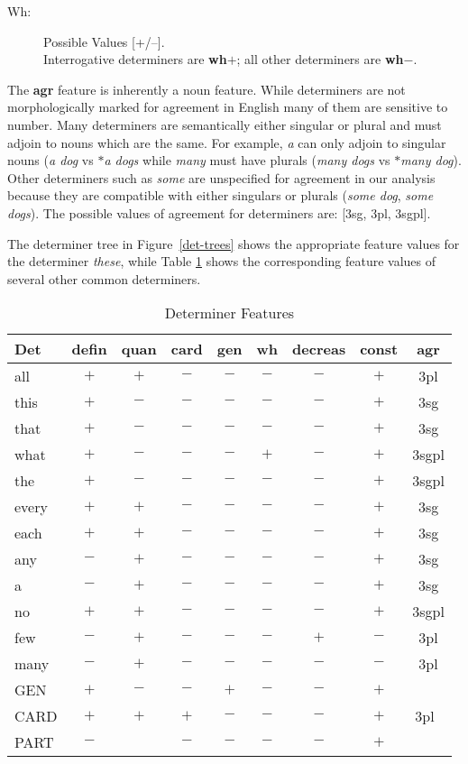 \begin{description}

\item[Wh:]  Possible Values [+/--]. \\
Interrogative determiners are {\bf wh$+$}; all other determiners are
{\bf wh$-$}. 
\end{description}

The {\bf agr} feature is inherently a noun feature.  While determiners
are not morphologically marked for agreement in English many of them
are sensitive to number.  Many determiners are semantically either
singular or plural and must adjoin to nouns which are the same. For
example, {\it a\/} can only adjoin to singular nouns ({\it a dog\/} vs
{\it $\ast$a dogs\/} while {\it many\/} must have plurals ({\it many
dogs\/} vs {\it $\ast$many dog\/}). Other determiners such as {\it some} are
unspecified for agreement in our analysis because they are compatible
with either singulars or plurals ({\it some dog}, {\it some
dogs}). The possible values of agreement for determiners are: [3sg, 3pl, 3sgpl].




The determiner tree in Figure~\ref{det-trees} shows the appropriate
feature values for the determiner {\it these}, while Table \ref{det-values}
shows the corresponding feature values of several other common determiners.

\small
\begin{table}
\centering
\begin{tabular}{|l||c|c|c|c|c|c|c|c|}
\hline
Det&defin&quan&card&gen&wh&decreas&const&agr\\
\hline
\hline
all&$+$&$+$&$-$&$-$&$-$&$-$&$+$&3pl\\
this&$+$&$-$&$-$&$-$&$-$&$-$&$+$&3sg\\
that&$+$&$-$&$-$&$-$&$-$&$-$&$+$&3sg\\
what&$+$&$-$&$-$&$-$&$+$&$-$&$+$&3sgpl\\
the&$+$&$-$&$-$&$-$&$-$&$-$&$+$&3sgpl\\
every&$+$&$+$&$-$&$-$&$-$&$-$&$+$&3sg\\
each&$+$&$+$&$-$&$-$&$-$&$-$&$+$&3sg\\
any&$-$&$+$&$-$&$-$&$-$&$-$&$+$&3sg\\
a&$-$&$+$&$-$&$-$&$-$&$-$&$+$&3sg\\
no&$+$&$+$&$-$&$-$&$-$&$-$&$+$&3sgpl\\
few&$-$&$+$&$-$&$-$&$-$&$+$&$-$&3pl\\
many&$-$&$+$&$-$&$-$&$-$&$-$&$-$&3pl\\
GEN&$+$&$-$&$-$&$+$&$-$&$-$&$+$&\\
CARD&$+$&$+$&$+$&$-$&$-$&$-$&$+$&3pl\footnotemark\ \\
PART&$-$&&$-$&$-$&$-$&$-$&$+$&\\
\hline
\end{tabular}
 \caption{Determiner Features}
\label{det-values}
\end{table}\addtocounter{footnote}{0} 

